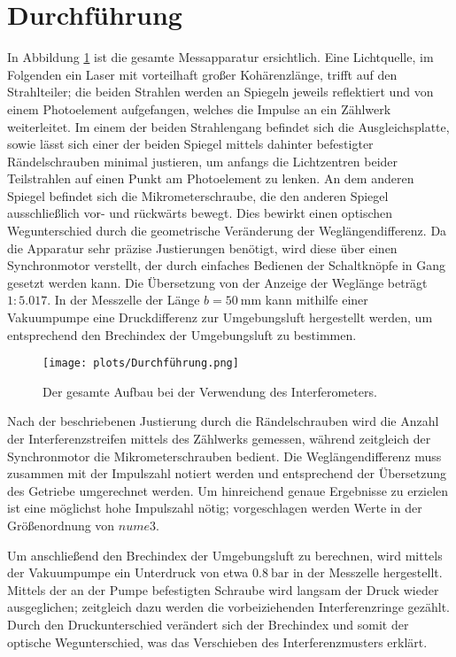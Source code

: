 \section{Durchführung}
\label{sec:Durchführung}

In Abbildung \ref{fig:Aufbau_Durchfuehrung} ist die gesamte Messapparatur ersichtlich. 
Eine Lichtquelle, im Folgenden ein Laser mit vorteilhaft großer Kohärenzlänge, trifft auf den Strahlteiler; die beiden Strahlen werden an Spiegeln jeweils 
reflektiert und von einem Photoelement aufgefangen, welches die Impulse an ein Zählwerk weiterleitet. 
Im einem der beiden Strahlengang befindet sich die Ausgleichsplatte, sowie lässt sich einer der beiden Spiegel mittels 
dahinter befestigter Rändelschrauben minimal justieren, um anfangs die Lichtzentren beider Teilstrahlen auf einen Punkt am Photoelement 
zu lenken. 
An dem anderen Spiegel befindet sich die Mikrometerschraube, die den anderen Spiegel ausschließlich vor- und rückwärts bewegt. 
Dies bewirkt einen optischen Wegunterschied durch die geometrische Veränderung der Weglängendifferenz. 
Da die Apparatur sehr präzise Justierungen benötigt, wird diese über einen Synchronmotor verstellt, der durch einfaches Bedienen 
der Schaltknöpfe in Gang gesetzt werden kann. 
Die Übersetzung von der Anzeige der Weglänge beträgt $1:5.017$.
In der Messzelle der Länge $b=\SI{50}{\milli\meter}$ kann mithilfe einer Vakuumpumpe eine Druckdifferenz zur Umgebungsluft hergestellt werden, 
um entsprechend den Brechindex der Umgebungsluft zu bestimmen.

\begin{figure}
    \centering
    \texttt{[image: plots/Durchführung.png]}
    \caption{Der gesamte Aufbau bei der Verwendung des Interferometers.}
    \label{fig:Aufbau_Durchfuehrung}
\end{figure}

Nach der beschriebenen Justierung durch die Rändelschrauben wird die Anzahl der Interferenzstreifen mittels des Zählwerks 
gemessen, während zeitgleich der Synchronmotor die Mikrometerschrauben bedient. 
Die Weglängendifferenz muss zusammen mit der Impulszahl notiert werden und entsprechend der Übersetzung des Getriebe umgerechnet werden. 
Um hinreichend genaue Ergebnisse zu erzielen ist eine möglichst hohe Impulszahl nötig; vorgeschlagen werden 
Werte in der Größenordnung von $num{e3}$. 

Um anschließend den Brechindex der Umgebungsluft zu berechnen, wird mittels der Vakuumpumpe ein Unterdruck von etwa $\SI{0.8}{\bar}$ 
in der Messzelle hergestellt. 
Mittels der an der Pumpe befestigten Schraube wird langsam der Druck wieder ausgeglichen; zeitgleich dazu werden die vorbeiziehenden 
Interferenzringe gezählt. 
Durch den Druckunterschied verändert sich der Brechindex und somit der optische Wegunterschied, was das Verschieben des Interferenzmusters erklärt. 

